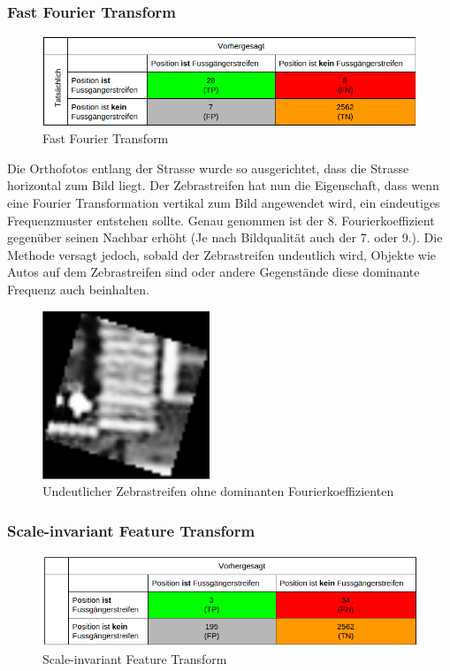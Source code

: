 \subsubsection{Fast Fourier Transform}	
\begin{figure}[H]
\includegraphics[width=\textwidth]{images/fast_fourier_conf.png}
\caption[Fast Fourier Transform]{Fast Fourier Transform}
\end{figure}
Die Orthofotos entlang der Strasse wurde so ausgerichtet, dass die Strasse horizontal zum Bild liegt. Der Zebrastreifen hat nun die Eigenschaft, dass wenn eine Fourier Transformation vertikal zum Bild angewendet wird, ein eindeutiges Frequenzmuster entstehen sollte. Genau genommen ist der 8. Fourierkoeffizient gegenüber seinen Nachbar erhöht (Je nach Bildqualität auch der 7. oder 9.).
Die Methode versagt jedoch, sobald der Zebrastreifen undeutlich wird, Objekte wie Autos auf dem Zebrastreifen sind oder andere Gegenstände diese dominante Frequenz auch beinhalten.
\begin{figure}[H]
	\centering
	\includegraphics[width=5cm]{images/Unsharp_Crosswalk2.png}\caption[Scale-invariant Feature Transform]{Undeutlicher Zebrastreifen ohne dominanten Fourierkoeffizienten}
\end{figure}
\subsubsection{Scale-invariant Feature Transform}	
\begin{figure}[H]
\includegraphics[width=\textwidth]{images/sif_conf.png}
\caption[Scale-invariant Feature Transform]{Scale-invariant Feature Transform}
\end{figure}
